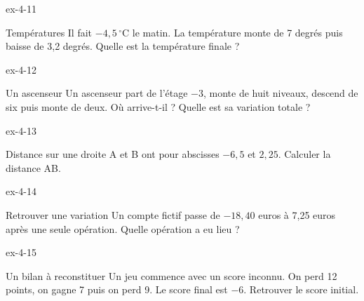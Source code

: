 \begin{blocLivre}{ex-4-11}\begin{exercice}[3]{Températures}
Il fait $-4{,}5\,^\circ$C le matin. La température monte de 7 degrés puis baisse de 3,2 degrés. Quelle est la température finale ?
\end{exercice}\end{blocLivre}
\begin{blocLivre}{ex-4-12}\begin{exercice}[3]{Un ascenseur}
Un ascenseur part de l’étage $-3$, monte de huit niveaux, descend de six puis monte de deux. Où arrive-t-il ? Quelle est sa variation totale ?
\end{exercice}\end{blocLivre}
\begin{blocLivre}{ex-4-13}\begin{exercice}[3]{Distance sur une droite}
A et B ont pour abscisses $-6{,}5$ et $2{,}25$. Calculer la distance AB.
\label{fig-ex-4-13}
\end{exercice}\end{blocLivre}
\begin{blocLivre}{ex-4-14}\begin{exercice}[3]{Retrouver une variation}
Un compte fictif passe de $-18{,}40$ euros à 7,25 euros après une seule opération. Quelle opération a eu lieu ?
\end{exercice}\end{blocLivre}
\begin{blocLivre}{ex-4-15}\begin{exercice}[3]{Un bilan à reconstituer}
Un jeu commence avec un score inconnu. On perd 12 points, on gagne 7 puis on perd 9. Le score final est $-6$. Retrouver le score initial.
\end{exercice}\end{blocLivre}

\clearpage
